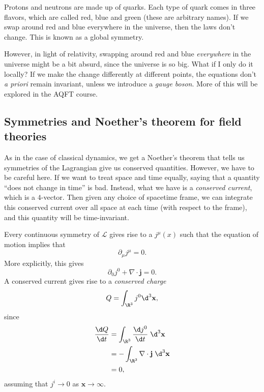 \documentclass[a4paper]{article}
\begin{document}
\begin{eg}
  Protons and neutrons are made up of quarks. Each type of quark comes in three flavors, which are called red, blue and green (these are arbitrary names). If we swap around red and blue everywhere in the universe, then the laws don't change. This is known as a global symmetry.

  However, in light of relativity, swapping around red and blue \emph{everywhere} in the universe might be a bit absurd, since the universe is so big. What if I only do it locally? If we make the change differently at different points, the equations don't \emph{a priori} remain invariant, unless we introduce a \emph{gauge boson}. More of this will be explored in the AQFT course.
\end{eg}

\subsection{Symmetries and Noether's theorem for field theories}
As in the case of classical dynamics, we get a Noether's theorem that tells us symmetries of the Lagrangian give us conserved quantities. However, we have to be careful here. If we want to treat space and time equally, saying that a quantity ``does not change in time'' is bad. Instead, what we have is a \emph{conserved current}, which is a $4$-vector. Then given any choice of spacetime frame, we can integrate this conserved current over all space at each time (with respect to the frame), and this quantity will be time-invariant.

\begin{thm}
  Every continuous symmetry of $\mathcal{L}$ gives rise to a  $j^\mu(x)$ such that the equation of motion implies that
  \[
    \partial_\mu j^\mu = 0.
  \]
  More explicitly, this gives
  \[
    \partial_0 j^0 + \nabla \cdot \mathbf{j} = 0.
  \]
  A conserved current gives rise to a \emph{conserved charge}
  \[
    Q = \int_{\R^3} j^0 \d^3 \mathbf{x},
  \]
  since
  \begin{align*}
    \frac{\d Q}{\d t} &= \int_{\R^3} \frac{\d j^0}{\d t} \;\d^3 \mathbf{x}\\
    &= -\int_{\R^3} \nabla \cdot \mathbf{j} \;\d ^3 \mathbf{x}\\
    &= 0,
  \end{align*}
  assuming that $j^i \to 0$ as $\mathbf{x} \to \infty$.
\end{thm}
\end{document}
